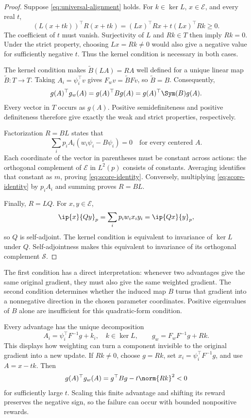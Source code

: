 \begin{proof}
Suppose \eqref{eq:universal-alignment} holds. For $k\in\ker L$, $x\in\mathcal E$, and every real $t$,
\[
(L(x+tk))^\top R(x+tk)=(Lx)^\top Rx+t(Lx)^\top Rk\ge0.
\]
The coefficient of $t$ must vanish. Surjectivity of $L$ and $Rk\in T$ then imply $Rk=0$. Under the strict property, choosing $Lx=Rk\ne0$ would also give a negative value for sufficiently negative $t$. Thus the kernel condition is necessary in both cases.

The kernel condition makes $\widetilde B(LA)=RA$ well defined for a unique linear map $\widetilde B:T\to T$. Taking $A_i=\psi_i^\top v$ gives $F_wv=\widetilde BFv$, so $\widetilde B=B$. Consequently,
\[
g(A)^\top g_w(A)=g(A)^\top Bg(A)=g(A)^\top\Sym(B)g(A).
\]
Every vector in $T$ occurs as $g(A)$. Positive semidefiniteness and positive definiteness therefore give exactly the weak and strict properties, respectively.

Factorization $R=BL$ states that
\[
\sum_i p_iA_i(w_i\psi_i-B\psi_i)=0\quad\text{for every centered }A.
\]
Each coordinate of the vector in parentheses must be constant across actions: the orthogonal complement of $\mathcal E$ in $L^2(p)$ consists of constants. Averaging identifies that constant as $m$, proving \eqref{eq:score-identity}. Conversely, multiplying \eqref{eq:score-identity} by $p_iA_i$ and summing proves $R=BL$.

Finally, $R=LQ$. For $x,y\in\mathcal E$,
\[
\ip{x}{Qy}_p=\sum_i p_iw_ix_iy_i=\ip{Qx}{y}_p,
\]
so $Q$ is self-adjoint. The kernel condition is equivalent to invariance of $\ker L$ under $Q$. Self-adjointness makes this equivalent to invariance of its orthogonal complement $\mathcal S$.
\end{proof}

The first condition has a direct interpretation: whenever two advantages give the same original gradient, they must also give the same weighted gradient. The second condition determines whether the induced map $B$ turns that gradient into a nonnegative direction in the chosen parameter coordinates. Positive eigenvalues of $B$ alone are insufficient for this quadratic-form condition.

Every advantage has the unique decomposition
\begin{equation}
A_i=\psi_i^\top F^{-1}g+k_i,\quad k\in\ker L,
\qquad
g_w=F_wF^{-1}g+Rk.
\label{eq:gradient-decomposition}
\end{equation}
This displays how weighting can turn a component invisible to the original gradient into a new update. If $Rk\ne0$, choose $g=Rk$, set $x_i=\psi_i^\top F^{-1}g$, and use $A=x-tk$. Then
\[
g(A)^\top g_w(A)=g^\top Bg-t\norm{Rk}^2<0
\]
for sufficiently large $t$. Scaling this finite advantage and shifting its reward preserves the negative sign, so the failure can occur with bounded nonpositive rewards.

